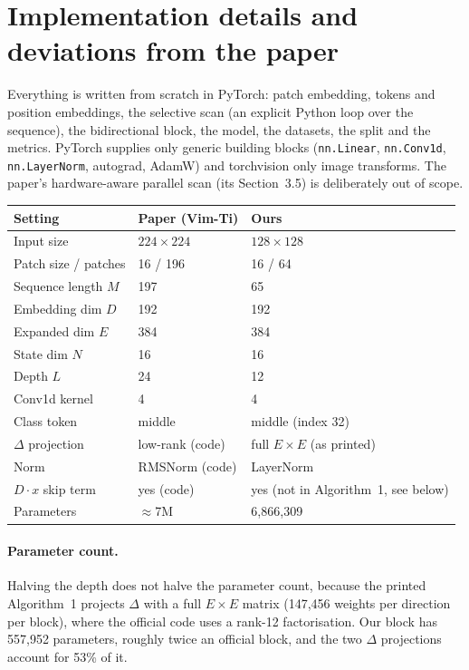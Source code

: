 \documentclass[11pt,a4paper]{article}
\begin{document}
\section{Implementation details and deviations from the paper}
\label{sec:impl}

Everything is written from scratch in PyTorch: patch embedding, tokens and position
embeddings, the selective scan (an explicit Python loop over the sequence), the
bidirectional block, the model, the datasets, the split and the metrics. PyTorch
supplies only generic building blocks (\texttt{nn.Linear}, \texttt{nn.Conv1d},
\texttt{nn.LayerNorm}, autograd, AdamW) and torchvision only image transforms.
The paper's hardware-aware parallel scan (its Section~3.5) is deliberately out of
scope.

\begin{center}
\begin{tabular}{lll}
\toprule
Setting & Paper (Vim-Ti) & Ours \\
\midrule
Input size            & $224\times224$ & $128\times128$ \\
Patch size / patches  & 16 / 196 & 16 / 64 \\
Sequence length $M$   & 197 & 65 \\
Embedding dim $D$     & 192 & 192 \\
Expanded dim $E$      & 384 & 384 \\
State dim $N$         & 16 & 16 \\
Depth $L$             & 24 & 12 \\
Conv1d kernel         & 4 & 4 \\
Class token           & middle & middle (index 32) \\
$\Delta$ projection   & low-rank (code) & full $E\times E$ (as printed) \\
Norm                  & RMSNorm (code) & LayerNorm \\
$D\cdot x$ skip term  & yes (code) & yes (not in Algorithm~1, see below) \\
Parameters            & $\approx$7M & 6,866,309 \\
\bottomrule
\end{tabular}
\end{center}

\paragraph{Parameter count.} Halving the depth does not halve the parameter count,
because the printed Algorithm~1 projects $\Delta$ with a full $E\times E$ matrix
(147,456 weights per direction per block), where the official code uses a rank-12
factorisation. Our block has 557,952 parameters, roughly twice an official block,
and the two $\Delta$ projections account for 53\% of it.
\end{document}
